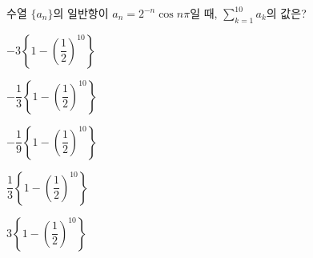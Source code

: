 수열 $\{a_n\}$의 일반항이 $a_n=2^{-n}\cos n\pi$일 때, $\displaystyle\sum_{k=1}^{10} a_k$의 값은?
\begin{choicesii}{\rule[-3ex]{0pt}{8ex}$-3\left\{1-\left(\dfrac{1}{2}\right)^{10}\right\}$}{\rule[-3ex]{0pt}{8ex}$-\dfrac{1}{3}\left\{1-\left(\dfrac{1}{2}\right)^{10}\right\}$}{\rule[-3ex]{0pt}{8ex}$-\dfrac{1}{9}\left\{1-\left(\dfrac{1}{2}\right)^{10}\right\}$}{\rule[-3ex]{0pt}{8ex}$\dfrac{1}{3}\left\{1-\left(\dfrac{1}{2}\right)^{10}\right\}$}{\rule[-3ex]{0pt}{8ex}$3\left\{1-\left(\dfrac{1}{2}\right)^{10}\right\}$}\end{choicesii}
